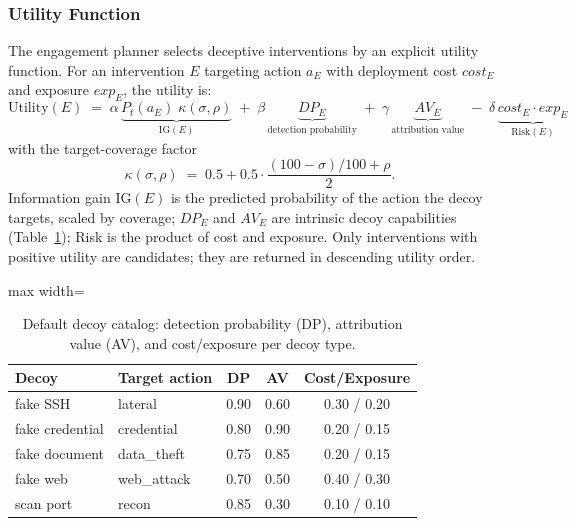 \documentclass[11pt]{article}
\begin{document}
\subsubsection{Utility Function}
\label{sec:utility-formal}

The engagement planner selects deceptive interventions by an explicit
utility function. For an intervention $E$ targeting action $a_E$ with
deployment cost $\mathit{cost}_E$ and exposure $\mathit{exp}_E$, the utility
is:
\begin{equation}
\label{eq:utility}
\mathrm{Utility}(E) \;=\;
\alpha\,\underbrace{P_t(a_E)\; \kappa(\sigma,\rho)}_{\mathrm{IG}(E)}
\;+\; \beta\,\underbrace{\mathit{DP}_E}_{\text{detection probability}}
\;+\; \gamma\,\underbrace{\mathit{AV}_E}_{\text{attribution value}}
\;-\; \delta\,\underbrace{\mathit{cost}_E \cdot \mathit{exp}_E}_{\mathrm{Risk}(E)}
\end{equation}
with the target-coverage factor
\begin{equation}
\label{eq:coverage}
\kappa(\sigma,\rho) \;=\; 0.5 + 0.5 \cdot \frac{(100-\sigma)/100 + \rho}{2}.
\end{equation}
Information gain $\mathrm{IG}(E)$ is the predicted probability of the action
the decoy targets, scaled by coverage; $\mathit{DP}_E$ and $\mathit{AV}_E$
are intrinsic decoy capabilities (Table~\ref{tab:decoy}); Risk is the
product of cost and exposure. Only interventions with positive utility are
candidates; they are returned in descending utility order.

\begin{table}[ht]
\centering
\begin{adjustbox}{max width=\linewidth}\begin{tabular}{@{}llccc@{}}
\toprule
\textbf{Decoy} & \textbf{Target action} & \textbf{DP} & \textbf{AV} & \textbf{Cost/Exposure} \\
\midrule
fake SSH & lateral & 0.90 & 0.60 & 0.30 / 0.20 \\
fake credential & credential & 0.80 & 0.90 & 0.20 / 0.15 \\
fake document & data\_theft & 0.75 & 0.85 & 0.20 / 0.15 \\
fake web & web\_attack & 0.70 & 0.50 & 0.40 / 0.30 \\
scan port & recon & 0.85 & 0.30 & 0.10 / 0.10 \\
\bottomrule
\end{tabular}\end{adjustbox}
\caption{Default decoy catalog: detection probability (DP), attribution
value (AV), and cost/exposure per decoy type.}
\label{tab:decoy}
\end{table}
\end{document}
